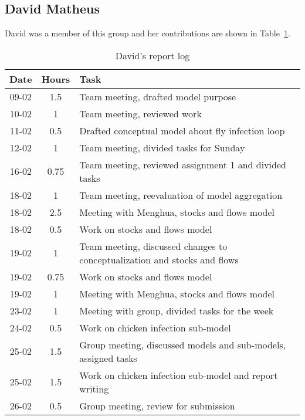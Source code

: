 
\subsection{David Matheus}
David was a member of this group and her contributions are shown in Table~\ref{tab:david_log}. 
\begin{longtable}[c]{c|c|m{35em}}
\caption{David's report log}
\label{tab:david_log}\\
\textbf{Date}& \textbf{Hours} & \textbf{Task} \\
\hline
\endfirsthead
%
\endhead
%
09-02   &   1.5     &   Team meeting, drafted model purpose                                         \\
10-02   &   1       &   Team meeting, reviewed work                                                 \\
11-02   &   0.5     &   Drafted conceptual model about fly infection loop                           \\
12-02   &   1       &   Team meeting, divided tasks for Sunday                                      \\
16-02   &   0.75    &   Team meeting, reviewed assignment 1 and divided tasks                       \\
18-02   &   1       &   Team meeting, reevaluation of model aggregation                             \\
18-02   &   2.5     &   Meeting with Menghua, stocks and flows model                                \\
18-02   &   0.5     &   Work on stocks and flows model                                              \\
19-02   &   1       &   Team meeting, discussed changes to conceptualization and stocks and flows   \\
19-02   &   0.75    &   Work on stocks and flows model                                              \\
19-02   &   1       &   Meeting with Menghua, stocks and flows model                                \\
23-02   &   1       &   Meeting with group, divided tasks for the week                              \\
24-02   &   0.5     &   Work on chicken infection sub-model                                          \\
25-02   &   1.5     &   Group meeting, discussed models and sub-models, assigned tasks          \\
25-02   &   1.5     &   Work on chicken infection sub-model and report writing                  \\
26-02   &   0.5     &   Group meeting, review for submission                                         \\
\end{longtable}


